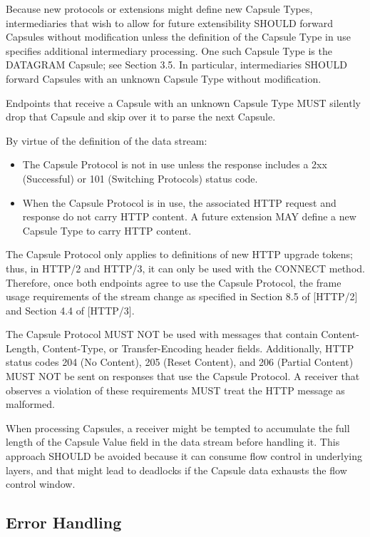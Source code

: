 \documentclass{article}
\begin{document}
Because new protocols or extensions might define new Capsule Types,
intermediaries that wish to allow for future extensibility SHOULD
forward Capsules without modification unless the definition of the
Capsule Type in use specifies additional intermediary processing.
One such Capsule Type is the DATAGRAM Capsule; see Section 3.5.  In
particular, intermediaries SHOULD forward Capsules with an unknown
Capsule Type without modification.

Endpoints that receive a Capsule with an unknown Capsule Type MUST
silently drop that Capsule and skip over it to parse the next
Capsule.

By virtue of the definition of the data stream:

\begin{itemize}
\item The Capsule Protocol is not in use unless the response includes a
  2xx (Successful) or 101 (Switching Protocols) status code.

\item When the Capsule Protocol is in use, the associated HTTP request
  and response do not carry HTTP content.  A future extension MAY
  define a new Capsule Type to carry HTTP content.
\end{itemize}

The Capsule Protocol only applies to definitions of new HTTP upgrade
tokens; thus, in HTTP/2 and HTTP/3, it can only be used with the
CONNECT method.  Therefore, once both endpoints agree to use the
Capsule Protocol, the frame usage requirements of the stream change
as specified in Section 8.5 of [HTTP/2] and Section 4.4 of [HTTP/3].

The Capsule Protocol MUST NOT be used with messages that contain
Content-Length, Content-Type, or Transfer-Encoding header fields.
Additionally, HTTP status codes 204 (No Content), 205 (Reset
Content), and 206 (Partial Content) MUST NOT be sent on responses
that use the Capsule Protocol.  A receiver that observes a violation
of these requirements MUST treat the HTTP message as malformed.

When processing Capsules, a receiver might be tempted to accumulate
the full length of the Capsule Value field in the data stream before
handling it.  This approach SHOULD be avoided because it can consume
flow control in underlying layers, and that might lead to deadlocks
if the Capsule data exhausts the flow control window.

\subsection{Error Handling}
\end{document}
